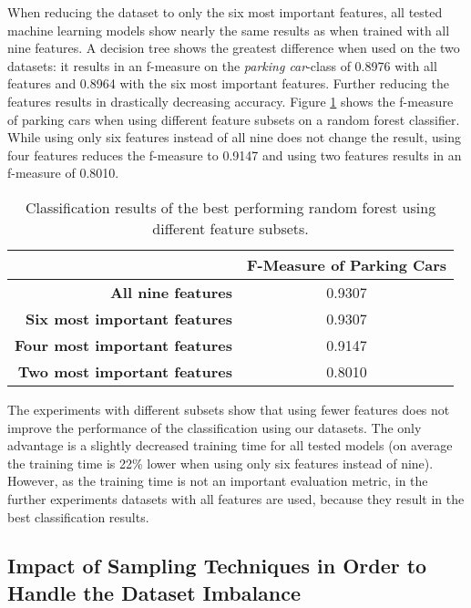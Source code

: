 When reducing the dataset to only the six most important features, all tested machine learning models show nearly the same results as when trained with all nine features. A decision tree shows the greatest difference when used on the two datasets: it results in an f-measure on the \emph{parking car}-class of 0.8976 with all features and 0.8964 with the six most important features. Further reducing the features results in drastically decreasing accuracy.
Figure \ref{table:result_subsets} shows the f-measure of parking cars when using different feature subsets on a random forest classifier.
While using only six features instead of all nine does not change the result, using four features reduces the f-measure to 0.9147 and using two features results in an f-measure of 0.8010.

\begin{table}


\centering
\bgroup
\def\arraystretch{1.4}
\begin{tabular}{| r || c |}
\hline
	&
   \textbf{F-Measure of Parking Cars} \\
\hline
   \textbf{All nine features}	&
   0.9307  \\
\hline
   \textbf{Six most important features}	&
   0.9307 \\
\hline
   \textbf{Four most important features}	&
   0.9147 \\
\hline
   \textbf{Two most important features}	&
   0.8010 \\
\hline

\end{tabular}
\egroup

\caption{Classification results of the best performing random forest using different feature subsets.}
\label{table:result_subsets}
\end{table}



The experiments with different subsets show that using fewer features does not improve the performance of the classification using our datasets. The only advantage is a slightly decreased training time for all tested models (on average the training time is 22\% lower when using only six features instead of nine). However, as the training time is not an important evaluation metric, in the further experiments datasets with all features are used, because they result in the best classification results.



\subsection{Impact of Sampling Techniques in Order to Handle the Dataset Imbalance}

